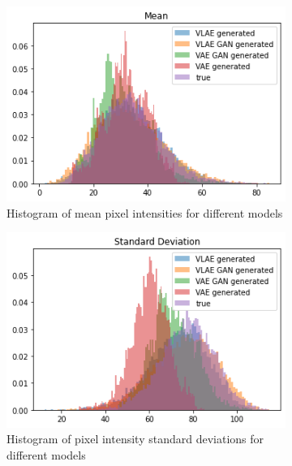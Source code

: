 \begin{figure}
    \centering
    \begin{subfigure}{0.4\textwidth}
        \centering
        \includegraphics[width=\textwidth]{images/generated_vs_true/mnist_vs_models_mean.png}
        \caption{Histogram of mean pixel intensities for different models}
        \label{subfig:mean_generated_vs_true}
    \end{subfigure}
    \hfill
    \begin{subfigure}{0.4\textwidth}
        \centering
        \includegraphics[width=\textwidth]{images/generated_vs_true/mnist_vs_models_sd.png}
        \caption{Histogram of pixel intensity standard deviations for different models}
        \label{subfig:sd_generated_vs_true}
    \end{subfigure}
    \hfill
    \begin{subfigure}{0.4\textwidth}

\end{subfigure}
\end{figure}
